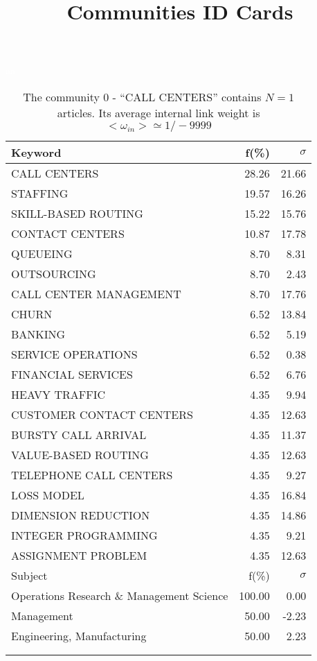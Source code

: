 \documentclass[a4paper,11pt]{report}
\title{{\bf Communities ID Cards}}
\date{\begin{flushleft}This document gather the ``ID Cards'' of the CC communities found within your database.\\
 The CC network was built by keeping a link between articles sharing at least 10 references. The communities characterized here correspond to the ones found in the level 0 (in the sense of the Louvain algo) which gathers more than 0 articles.\\
 These ID cards displays the most frequent keywords, subject categories, journals of publication, institution, countries, authors, references and reference journals of the articles of each community. The significance of an item $\sigma = \sqrt{N} (f - p) / \sqrt{p(1-p)}$ [where $N$ is the number of articles within the community and $f$ and $p$ are the proportion of articles respectively within the community and within the database displaying that item ] is also given (for example $\sigma > 5$ is really highly significant).\\
\vspace{1cm}
\copyright Sebastian Grauwin, Liu Weizhi - (2014) \end{flushleft}}
\begin{document}
\begin{landscape}
\maketitle
\clearpage

\begin{table}[!ht]
\caption{The community 0 - ``CALL CENTERS'' contains $N = 1$ articles. Its average internal link weight is $<\omega_{in}> \simeq 1/-9999$ }
\textcolor{white}{aa}\\
{\scriptsize\begin{tabular}{|l r r|}
\hline
Keyword & f(\%) & $\sigma$\\
\hline
CALL CENTERS & 28.26 & 21.66\\
STAFFING & 19.57 & 16.26\\
SKILL-BASED ROUTING & 15.22 & 15.76\\
CONTACT CENTERS & 10.87 & 17.78\\
QUEUEING & 8.70 & 8.31\\
OUTSOURCING & 8.70 & 2.43\\
CALL CENTER MANAGEMENT & 8.70 & 17.76\\
CHURN & 6.52 & 13.84\\
BANKING & 6.52 & 5.19\\
SERVICE OPERATIONS & 6.52 & 0.38\\
FINANCIAL SERVICES & 6.52 & 6.76\\
HEAVY TRAFFIC & 4.35 & 9.94\\
CUSTOMER CONTACT CENTERS & 4.35 & 12.63\\
BURSTY CALL ARRIVAL & 4.35 & 11.37\\
VALUE-BASED ROUTING & 4.35 & 12.63\\
TELEPHONE CALL CENTERS & 4.35 & 9.27\\
LOSS MODEL & 4.35 & 16.84\\
DIMENSION REDUCTION & 4.35 & 14.86\\
INTEGER PROGRAMMING & 4.35 & 9.21\\
ASSIGNMENT PROBLEM & 4.35 & 12.63\\
\hline
\hline
Subject & f(\%) & $\sigma$\\
\hline
Operations Research \& Management Science & 100.00 & 0.00\\
Management & 50.00 & -2.23\\
Engineering, Manufacturing & 50.00 & 2.23\\
 &  & \\
 &  & \\

\end{tabular}}
\end{table}
\end{landscape}
\end{document}
